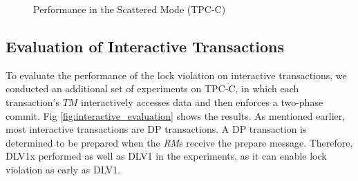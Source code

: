 \documentclass[conference]{IEEEtran}
\begin{document}
\begin{figure}[tbp]
  \centering


\caption{Performance in the Scattered Mode (TPC-C) }
\label{fig:new_order_add_terminal_scattered}
\end{figure}

\subsection{Evaluation of Interactive Transactions}
To evaluate the performance of the lock violation on interactive transactions,
we conducted an additional set of experiments on TPC-C, in which each transaction's ${TM}$ interactively accesses data and then enforces a two-phase commit.
Fig \ref{fig:interactive_evaluation} shows the results.
As mentioned earlier, most interactive transactions are DP transactions.
A DP transaction is determined to be prepared when the \emph{RM}s receive the prepare message.
Therefore, DLV1x performed as well as DLV1 in the experiments, as it can enable lock violation as early as DLV1.
\end{document}
